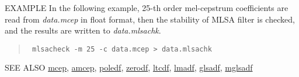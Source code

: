 \begin{qsection}{EXAMPLE}
In the following example,
25-th order mel-cepstrum coefficients are
read from {\em data.mcep} in float format,
then the stability of MLSA filter is checked,
 and the results are written to {\em data.mlsachk}.
\begin{quote}
 \verb! mlsacheck -m 25 -c data.mcep > data.mlsachk !
\end{quote}
\end{qsection}

\begin{qsection}{SEE ALSO}
\hyperlink{mcep}{mcep},
\hyperlink{amcep}{amcep},
\hyperlink{poledf}{poledf},
\hyperlink{zerodf}{zerodf},
\hyperlink{ltcdf}{ltcdf},
\hyperlink{lmadf}{lmadf},
\hyperlink{glsadf}{glsadf},
\hyperlink{mglsadf}{mglsadf}
\end{qsection}
